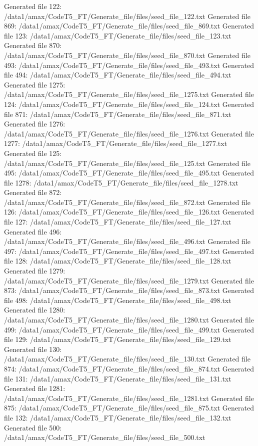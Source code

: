 Generated file 122: /data1/amax/CodeT5_FT/Generate_file/files/seed_file_122.txt
Generated file 869: /data1/amax/CodeT5_FT/Generate_file/files/seed_file_869.txt
Generated file 123: /data1/amax/CodeT5_FT/Generate_file/files/seed_file_123.txt
Generated file 870: /data1/amax/CodeT5_FT/Generate_file/files/seed_file_870.txt
Generated file 493: /data1/amax/CodeT5_FT/Generate_file/files/seed_file_493.txt
Generated file 494: /data1/amax/CodeT5_FT/Generate_file/files/seed_file_494.txt
Generated file 1275: /data1/amax/CodeT5_FT/Generate_file/files/seed_file_1275.txt
Generated file 124: /data1/amax/CodeT5_FT/Generate_file/files/seed_file_124.txt
Generated file 871: /data1/amax/CodeT5_FT/Generate_file/files/seed_file_871.txt
Generated file 1276: /data1/amax/CodeT5_FT/Generate_file/files/seed_file_1276.txt
Generated file 1277: /data1/amax/CodeT5_FT/Generate_file/files/seed_file_1277.txt
Generated file 125: /data1/amax/CodeT5_FT/Generate_file/files/seed_file_125.txt
Generated file 495: /data1/amax/CodeT5_FT/Generate_file/files/seed_file_495.txt
Generated file 1278: /data1/amax/CodeT5_FT/Generate_file/files/seed_file_1278.txt
Generated file 872: /data1/amax/CodeT5_FT/Generate_file/files/seed_file_872.txt
Generated file 126: /data1/amax/CodeT5_FT/Generate_file/files/seed_file_126.txt
Generated file 127: /data1/amax/CodeT5_FT/Generate_file/files/seed_file_127.txt
Generated file 496: /data1/amax/CodeT5_FT/Generate_file/files/seed_file_496.txt
Generated file 497: /data1/amax/CodeT5_FT/Generate_file/files/seed_file_497.txt
Generated file 128: /data1/amax/CodeT5_FT/Generate_file/files/seed_file_128.txt
Generated file 1279: /data1/amax/CodeT5_FT/Generate_file/files/seed_file_1279.txt
Generated file 873: /data1/amax/CodeT5_FT/Generate_file/files/seed_file_873.txt
Generated file 498: /data1/amax/CodeT5_FT/Generate_file/files/seed_file_498.txt
Generated file 1280: /data1/amax/CodeT5_FT/Generate_file/files/seed_file_1280.txt
Generated file 499: /data1/amax/CodeT5_FT/Generate_file/files/seed_file_499.txt
Generated file 129: /data1/amax/CodeT5_FT/Generate_file/files/seed_file_129.txt
Generated file 130: /data1/amax/CodeT5_FT/Generate_file/files/seed_file_130.txt
Generated file 874: /data1/amax/CodeT5_FT/Generate_file/files/seed_file_874.txt
Generated file 131: /data1/amax/CodeT5_FT/Generate_file/files/seed_file_131.txt
Generated file 1281: /data1/amax/CodeT5_FT/Generate_file/files/seed_file_1281.txt
Generated file 875: /data1/amax/CodeT5_FT/Generate_file/files/seed_file_875.txt
Generated file 132: /data1/amax/CodeT5_FT/Generate_file/files/seed_file_132.txt
Generated file 500: /data1/amax/CodeT5_FT/Generate_file/files/seed_file_500.txt
